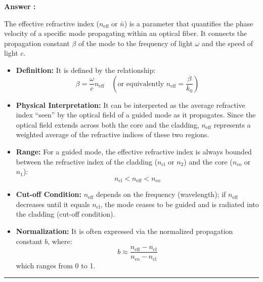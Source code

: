 \documentclass[a4paper,11pt]{book}
\newcounter{qacount}
\newenvironment{answer}{
  \noindent\textbf{Answer \theqacount:}\space
}{
  \par\vspace{1em}   %
  \hrule             %
  \vspace{0.5em}     %
}
\begin{document}
\begin{answer}
    The effective refractive index ($n_{\text{eff}}$ or $\bar{n}$) is a parameter that quantifies the phase velocity of a specific mode propagating within an optical fiber. It connects the propagation constant $\beta$ of the mode to the frequency of light $\omega$ and the speed of light $c$.

    \begin{itemize}
        \item \textbf{Definition:} It is defined by the relationship:
              \begin{equation*}
                  \beta = \frac{\omega}{c} n_{\text{eff}} \quad \left( \text{or equivalently } n_{\text{eff}} = \frac{\beta}{k_0} \right)
              \end{equation*}

        \item \textbf{Physical Interpretation:} It can be interpreted as the average refractive index ``seen'' by the optical field of a guided mode as it propagates. Since the optical field extends across both the core and the cladding, $n_{\text{eff}}$ represents a weighted average of the refractive indices of these two regions.

        \item \textbf{Range:} For a guided mode, the effective refractive index is always bounded between the refractive index of the cladding ($n_{\text{cl}}$ or $n_2$) and the core ($n_{\text{co}}$ or $n_1$):
              \begin{equation*}
                  n_{\text{cl}} < n_{\text{eff}} < n_{\text{co}}
              \end{equation*}

        \item \textbf{Cut-off Condition:} $n_{\text{eff}}$ depends on the frequency (wavelength); if $n_{\text{eff}}$ decreases until it equals $n_{\text{cl}}$, the mode ceases to be guided and is radiated into the cladding (cut-off condition).

        \item \textbf{Normalization:} It is often expressed via the normalized propagation constant $b$, where:
              \begin{equation*}
                  b \approx \frac{n_{\text{eff}} - n_{\text{cl}}}{n_{\text{co}} - n_{\text{cl}}}
              \end{equation*}
              which ranges from 0 to 1.
    \end{itemize}
\end{answer}
\end{document}
